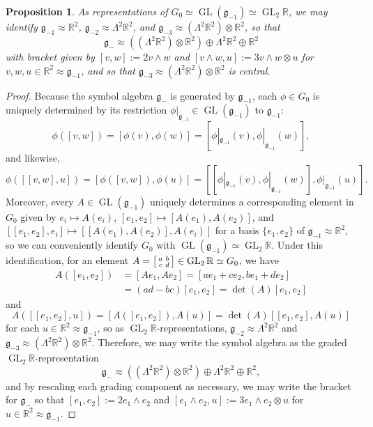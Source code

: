 \documentclass[12pt,a4paper]{amsart}
\newtheorem{proposition}[theorem]{Proposition}
\theoremstyle{definition}
\DeclareMathOperator{\GLin}{GL}
\newenvironment{smallbmatrix}
  {\left[\begin{smallmatrix}}
  {\end{smallmatrix}\right]}
\begin{document}
\begin{proposition}As representations of $G_0\simeq\GLin(\mathfrak{g}_{-1})\simeq\GLin_2\mathbb{R}$, we may identify $\mathfrak{g}_{-1}\approx\mathbb{R}^2$, $\mathfrak{g}_{-2}\approx\Lambda^2\mathbb{R}^2$, and $\mathfrak{g}_{-3}\approx(\Lambda^2\mathbb{R}^2)\otimes\mathbb{R}^2$, so that
\[\mathfrak{g}_-\approx((\Lambda^2\mathbb{R}^2)\otimes\mathbb{R}^2)\oplus\Lambda^2\mathbb{R}^2\oplus\mathbb{R}^2\]
with bracket given by $[v,w]:=2v\wedge w$ and $[v\wedge w,u]:=3v\wedge w\otimes u$ for $v,w,u\in\mathbb{R}^2\approx\mathfrak{g}_{-1}$, and so that $\mathfrak{g}_{-3}\approx(\Lambda^2\mathbb{R}^2)\otimes\mathbb{R}^2$ is central.\end{proposition}
\begin{proof}Because the symbol algebra $\mathfrak{g}_-$ is generated by $\mathfrak{g}_{-1}$, each $\phi\in G_0$ is uniquely determined by its restriction $\phi|_{\mathfrak{g}_{-1}}\in\GLin(\mathfrak{g}_{-1})$ to $\mathfrak{g}_{-1}$:
\[\phi([v,w])=[\phi(v),\phi(w)]=[\phi|_{\mathfrak{g}_{-1}}(v),\phi|_{\mathfrak{g}_{-1}}(w)],\]
and likewise,
\[\phi([[v,w],u])=[\phi([v,w]),\phi(u)]=[[\phi|_{\mathfrak{g}_{-1}}(v),\phi|_{\mathfrak{g}_{-1}}(w)],\phi|_{\mathfrak{g}_{-1}}(u)].\]
Moreover, every $A\in\GLin(\mathfrak{g}_{-1})$ uniquely determines a corresponding element in $G_0$ given by $e_i\mapsto A(e_i)$, $[e_1,e_2]\mapsto [A(e_1),A(e_2)]$, and $[[e_1,e_2],e_i]\mapsto [[A(e_1),A(e_2)],A(e_i)]$ for a basis $\{e_1,e_2\}$ of $\mathfrak{g}_{-1}\approx\mathbb{R}^2$, so we can conveniently identify $G_0$ with $\GLin(\mathfrak{g}_{-1})\simeq\GLin_2\mathbb{R}$. Under this identification, for an element $A=\begin{smallbmatrix}a & b \\ c & d\end{smallbmatrix}\in\GLin_2\mathbb{R}\simeq G_0$, we have
\begin{align*}A([e_1,e_2]) & =[Ae_1,Ae_2]=[ae_1+ce_2,be_1+de_2] \\ & =(ad-bc)[e_1,e_2]=\det(A)[e_1,e_2]\end{align*}
and
\[A([[e_1,e_2],u])=[A([e_1,e_2]),A(u)]=\det(A)[[e_1,e_2],A(u)]\]
for each $u\in\mathbb{R}^2\approx\mathfrak{g}_{-1}$, so as $\GLin_2\mathbb{R}$-representations, $\mathfrak{g}_{-2}\approx\Lambda^2\mathbb{R}^2$ and $\mathfrak{g}_{-3}\approx(\Lambda^2\mathbb{R}^2)\otimes\mathbb{R}^2$. Therefore, we may write the symbol algebra as the graded $\GLin_2\mathbb{R}$-representation
\[\mathfrak{g}_-\approx((\Lambda^2\mathbb{R}^2)\otimes\mathbb{R}^2)\oplus\Lambda^2\mathbb{R}^2\oplus\mathbb{R}^2,\]
and by rescaling each grading component as necessary, we may write the bracket for $\mathfrak{g}_-$ so that $[e_1,e_2]:=2e_1\wedge e_2$ and $[e_1\wedge e_2,u]:=3e_1\wedge e_2\otimes u$ for $u\in\mathbb{R}^2\approx\mathfrak{g}_{-1}$.\mbox{\qedhere}\end{proof}
\end{document}
